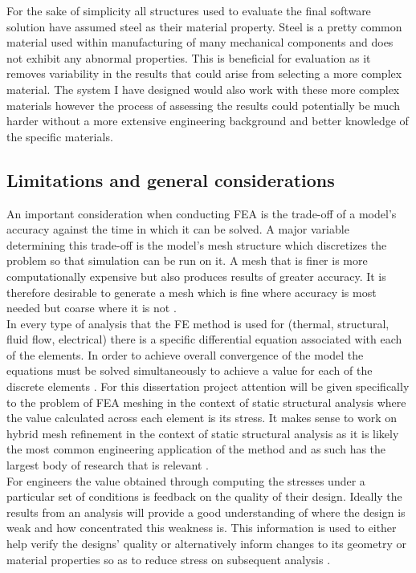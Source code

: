 \noindent
For the sake of simplicity all structures used to evaluate the final software solution have assumed steel as their material property. Steel is a pretty common material used within manufacturing of many mechanical components and does not exhibit any abnormal properties. This is beneficial for evaluation as it removes variability in the results that could arise from selecting a more complex material. The system I have designed would also work with these more complex materials however the process of assessing the results could potentially be much harder without a more extensive engineering background and better knowledge of the specific materials. 

\subsection{Limitations and general considerations}
\noindent
An important consideration when conducting FEA is the trade-off of a model's accuracy against the time in which it can be solved. A major variable determining this trade-off is the model's mesh structure which discretizes the problem so that simulation can be run on it. A mesh that is finer is more computationally expensive but also produces results of greater accuracy. It is therefore desirable to generate a mesh which is fine where accuracy is most needed but coarse where it is not \cite{cite04}. \\

\noindent
In every type of analysis that the FE method is used for (thermal, structural, fluid flow, electrical) there is a specific differential equation associated with each of the elements. In order to achieve overall convergence of the model the equations must be solved simultaneously to achieve a value for each of the discrete elements \cite{IntroductionToFE}. For this dissertation project attention will be given specifically to the problem of FEA meshing in the context of static structural analysis where the value calculated across each element is its stress. It makes sense to work on hybrid mesh refinement in the context of static structural analysis as it is likely the most common engineering application of the method and as such has the largest body of research that is relevant \cite{DolsakPaper94}\cite{IntroductionToFE}.\\

\noindent
For engineers the value obtained through computing the stresses under a particular set of conditions is feedback on the quality of their design. Ideally the results from an analysis will provide a good understanding of where the design is weak and how concentrated this weakness is. This information is used to either help verify the designs' quality or alternatively inform changes to its geometry or material properties so as to reduce stress on subsequent analysis \cite{cite06}.\\


